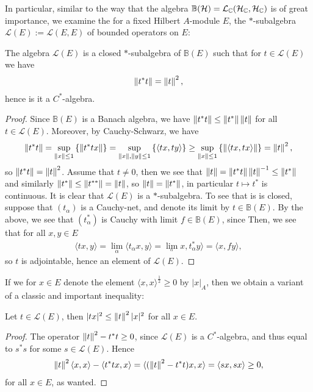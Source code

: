 In particular, similar to the way that the algebra $\mathbb{B}(\mathcal{H}) = \mathcal{L}_{\mathbb{C}}(\mathcal{H}_{\mathbb{C}},\mathcal{H}_{\mathbb{C}})$ is of great importance, we examine the for a fixed Hilbert $A$-module $E$, the $*$-subalgebra $\mathcal{L}(E):=\mathcal{L}(E,E)$ of bounded operators on $E$:
\begin{proposition}
	The algebra $\mathcal{L}(E)$ is a closed $*$-subalgebra of $\mathbb{B}(E)$ such that for $t \in \mathcal{L}(E)$ we have
	\begin{align*}
		\left\lVert t^*t\right\rVert = \left\lVert t \right\rVert^2,
	\end{align*}
	hence is it a $C^*$-algebra.
\end{proposition}
\begin{proof}
	Since $\mathbb{B}(E)$ is a Banach algebra, we have $\left\lVert t^*t\right\rVert \leq \left\lVert t^*\right\rVert \left\lVert t\right\rVert$ for all $t \in \mathcal{L}(E)$. Moreover, by Cauchy-Schwarz, we have
	\begin{align*}
		\left\lVert t^* t \right\rVert = \sup_{\left\lVert x \right\rVert \leq 1} \left\{ \left\lVert t^*tx\right\rVert \right\} = \sup_{\left\lVert x\right\rVert, \left\lVert y \right\rVert \leq 1} \left\{ \langle tx,ty\rangle \right\}\geq \sup_{\left\lVert x \right\rVert \leq 1} \left\{ \left\lVert \langle tx, tx \rangle \right\rVert \right\} = \left\lVert t \right\rVert^2,
	\end{align*}
	so $\left\lVert t^*t\right\rVert = \left\lVert t\right\rVert^2$. Assume that $t \neq 0$, then we see that $\left\lVert t \right\rVert = \left\lVert t^* t\right\rVert \left\lVert t \right\rVert ^{-1} \leq \left\lVert t^*\right\rVert$ and similarly $\left\lVert t^*\right\rVert \leq \left\lVert t^{**}\right\rVert=\left\lVert t \right\rVert$, so $\left\lVert t \right\rVert = \left\lVert t^*\right\rVert$, in particular $t \mapsto t^*$ is continuous. It is clear that $\mathcal{L}(E)$ is a $*$-subalgebra. To see that is is closed, suppose that $(t_\alpha)$ is a Cauchy-net, and denote its limit by $t \in \mathbb{B}(E)$. By the above, we see that $(t_\alpha^*)$ is Cauchy with limit $f \in \mathbb{B}(E)$, since  Then, we see that for all $x,y \in E$ 
	\begin{align*}
		\langle t x,y\rangle = \lim_{\alpha}\langle t_\alpha x , y \rangle = \lim_{_\alpha} x, t_\alpha^* y \rangle = \langle x,fy\rangle,
	\end{align*}
	so $t$ is adjointable, hence an element of $\mathcal{L}(E)$.
\end{proof}
If we for $x \in E$ denote the element $\langle x, x \rangle^{\frac12}\geq 0$ by $|x|_A$, then we obtain a variant of a classic and important inequality:
\begin{lemma}
	Let $t \in \mathcal{L}(E)$, then $|tx|^2 \leq \left\lVert t \right\rVert^2 |x|^2$ for all $x \in E$.
\end{lemma}
\begin{proof}
	The operator $\left\lVert t \right\rVert ^2-t^*t\geq 0$, since $\mathcal{L}(E)$ is a $C^*$-algebra, and thus equal to $s^*s$ for some $s \in \mathcal{L}(E)$. Hence
	\begin{align*}
	\left\lVert t \right\rVert^2 \langle x, x \rangle - \langle t^*t x,x\rangle =\langle (\left\lVert t \right\rVert^2 - t^*t)x,x\rangle=	\langle sx , sx \rangle  \geq 0,
	\end{align*}
	for all $x \in E$, as wanted.
\end{proof}
